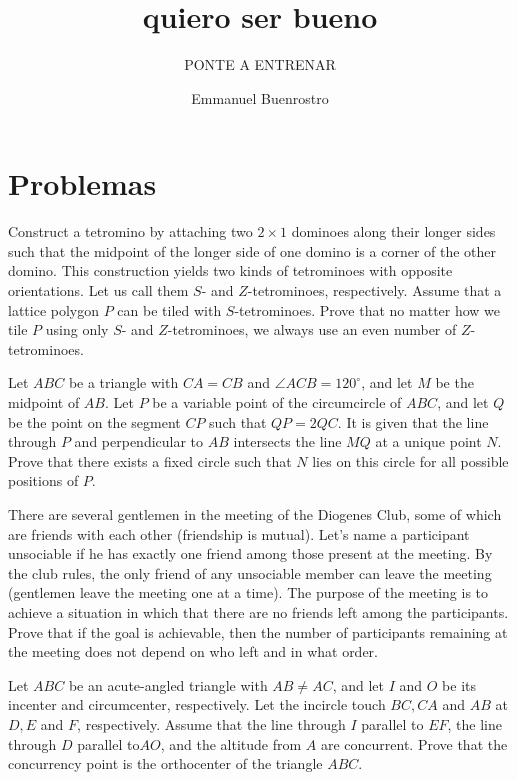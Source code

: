 \documentclass[11pt]{scrartcl}
\title{quiero ser bueno }
\subtitle{PONTE A ENTRENAR}
\author{Emmanuel Buenrostro}
\begin{document}
\maketitle

\section{Problemas}
\begin{problem}[3556283025270446335]
Construct a tetromino by attaching two $2 \times 1$ dominoes along their longer sides such that the midpoint of the longer side of one domino is a corner of the other domino. This construction yields two kinds of tetrominoes with opposite orientations. Let us call them $S$- and $Z$-tetrominoes, respectively.
Assume that a lattice polygon $P$ can be tiled with $S$-tetrominoes. Prove that no matter how we tile $P$ using only $S$- and $Z$-tetrominoes, we always use an even number of $Z$-tetrominoes.
\end{problem}
\begin{problem}[220345421587712]
Let $ABC$ be a triangle with $CA=CB$ and $\angle{ACB}=120^\circ$, and let $M$ be the midpoint of $AB$. Let $P$ be a variable point of the circumcircle of $ABC$, and let $Q$ be the point on the segment $CP$ such that $QP = 2QC$. It is given that the line through $P$ and perpendicular to $AB$ intersects the line $MQ$ at a unique point $N$.
Prove that there exists a fixed circle such that $N$ lies on this circle for all possible positions of $P$.
\end{problem}
\begin{problem}[645068477920006]
There are several gentlemen in the meeting of the Diogenes Club, some of which are friends with each other (friendship is mutual). Let's name a participant unsociable if he has exactly one friend among those present at the meeting. By the club rules, the only friend of any unsociable member can leave the meeting (gentlemen leave the meeting one at a time). The purpose of the meeting is to achieve a situation in which that there are no friends left among the participants. Prove that if the goal is achievable, then the number of participants remaining at the meeting does not depend on who left and in what order.
\end{problem}
\begin{problem}[318208660266829737]
Let $ABC$ be an acute-angled triangle with $AB \ne AC$, and let $I$ and $O$ be its incenter and circumcenter, respectively. Let the incircle touch $BC, CA$ and $AB$ at $D, E$ and $F$, respectively. Assume that the line through $I$ parallel to $EF$, the line through $D$ parallel to$ AO$, and the altitude from $A$ are concurrent. Prove that the concurrency point is the orthocenter of the triangle $ABC$.
\end{problem}
\end{document}
